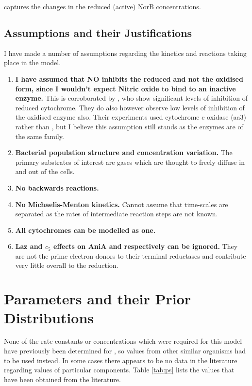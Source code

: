 captures the changes in the reduced (active) NorB concentrations.

\subsection{Assumptions and their Justifications}
I have made a number of assumptions regarding the kinetics and reactions taking place in the model.
\begin{enumerate}
 \item {\bf I have assumed that NO inhibits the reduced \cbbthree{} and not the oxidised form, since I wouldn't expect Nitric oxide to bind to an inactive enzyme.} This is corroborated by \citet{Giuffre2000}, who show significant levels of inhibition of reduced cytochrome. They do also however observe low levels of inhibition of the oxidised enzyme also. Their experiments used cytochrome c oxidase (aa3) rather than \cbbthree{}, but I believe this assumption still stands as the enzymes are of the same family.
 \item {\bf Bacterial population structure and concentration variation.} The primary substrates of interest are gases which are thought to freely diffuse in and out of the cells.
 \item {\bf No backwards reactions.}
 \item {\bf No Michaelis-Menton kinetics.} Cannot assume that time-scales are separated as the rates of intermediate reaction steps are not known.
 \item {\bf All cytochromes can be modelled as one.}
 \item {\bf Laz and $c_5$ effects on AniA and \cbbthree{} respectively can be ignored.} They are not the prime electron donors to their terminal reductases and contribute very little overall to the reduction\cite{Deeudom2007}.
\end{enumerate}


\section{Parameters and their Prior Distributions}

None of the rate constants or concentrations which were required for this model have previously been determined for \Nsm, so values from other similar organisms had to be used instead. In some cases there appears to be no data in the literature regarding values of particular components. Table \ref{tab:ps} lists the values that have been obtained from the literature.

